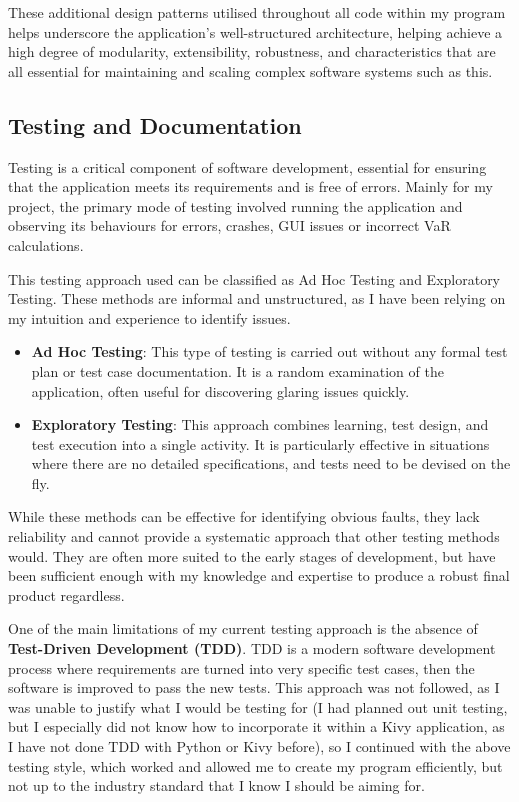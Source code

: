 \documentclass{article}
\begin{document}
These additional design patterns utilised throughout all code within my program helps underscore the application's well-structured architecture, helping achieve a high degree of modularity, extensibility, robustness, and characteristics that are all essential for maintaining and scaling complex software systems such as this.

\subsection{Testing and Documentation}

Testing is a critical component of software development, essential for ensuring that the application meets its requirements and is free of errors. Mainly for my project, the primary mode of testing involved running the application and observing its behaviours for errors, crashes, GUI issues or incorrect VaR calculations.\\\vspace{0.3cm}

This testing approach used can be classified as Ad Hoc Testing and Exploratory Testing. These methods are informal and unstructured, as I have been relying on my intuition and experience to identify issues.

\begin{itemize}
    \item \textbf{Ad Hoc Testing}: This type of testing is carried out without any formal test plan or test case documentation. It is a random examination of the application, often useful for discovering glaring issues quickly.
    \item \textbf{Exploratory Testing}: This approach combines learning, test design, and test execution into a single activity. It is particularly effective in situations where there are no detailed specifications, and tests need to be devised on the fly.
\end{itemize}

While these methods can be effective for identifying obvious faults, they lack reliability and cannot provide a systematic approach that other testing methods would. They are often more suited to the early stages of development, but have been sufficient enough with my knowledge and expertise to produce a robust final product regardless.\\\vspace{0.3cm}

One of the main limitations of my current testing approach is the absence of \textbf{Test-Driven Development (TDD)}. TDD is a modern software development process where requirements are turned into very specific test cases, then the software is improved to pass the new tests. This approach was not followed, as I was unable to justify what I would be testing for (I had planned out unit testing, but I especially did not know how to incorporate it within a Kivy application, as I have not done TDD with Python or Kivy before), so I continued with the above testing style, which worked and allowed me to create my program efficiently, but not up to the industry standard that I know I should be aiming for.\\\vspace{0.3cm}
\end{document}
